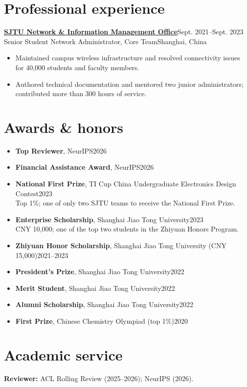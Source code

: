 \documentclass[11pt,letterpaper]{article}
\begin{document}
\section{Professional experience}
\textbf{\href{https://nimo.sjtu.edu.cn}{SJTU Network \& Information Management Office}}\hfill Sept. 2021--Sept. 2023\\
Senior Student Network Administrator, Core Team\hfill Shanghai, China
\begin{itemize}
\item Maintained campus wireless infrastructure and resolved connectivity issues for 40,000 students and faculty members.
\item Authored technical documentation and mentored two junior administrators; contributed more than 300 hours of service.
\end{itemize}
\section{Awards \& honors}
\begin{itemize}
\item \textbf{Top Reviewer}, NeurIPS\hfill 2026
\item \textbf{Financial Assistance Award}, NeurIPS\hfill 2026
\item \textbf{National First Prize}, TI Cup China Undergraduate Electronics Design Contest\hfill 2023\\
{\small Top 1\%; one of only two SJTU teams to receive the National First Prize.}
\item \textbf{Enterprise Scholarship}, Shanghai Jiao Tong University\hfill 2023\\
{\small CNY 10,000; one of the top two students in the Zhiyuan Honors Program.}
\item \textbf{Zhiyuan Honor Scholarship}, Shanghai Jiao Tong University (CNY 15,000)\hfill 2021--2023
\item \textbf{President's Prize}, Shanghai Jiao Tong University\hfill 2022
\item \textbf{Merit Student}, Shanghai Jiao Tong University\hfill 2022
\item \textbf{Alumni Scholarship}, Shanghai Jiao Tong University\hfill 2022
\item \textbf{First Prize}, Chinese Chemistry Olympiad (top 1\%)\hfill 2020
\end{itemize}
\section{Academic service}
\textbf{Reviewer:} ACL Rolling Review (2025--2026); NeurIPS (2026).
\end{document}
